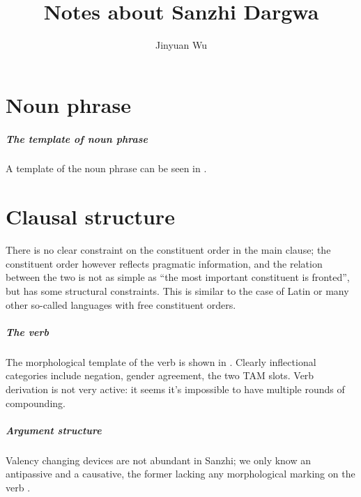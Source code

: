 \documentclass[a4paper, oneside, 12pt]{report}
\title{Notes about Sanzhi Dargwa}
\author{Jinyuan Wu}
\newcommand*{\citesec}[1]{\S~{#1}}
\newcommand*{\citetable}[1]{Table~{#1}}
\begin{document}
\maketitle

\chapter{Noun phrase}

\paragraph*{The template of noun phrase} A template of the noun phrase 
can be seen in \citet[\citesec{21.1.3}]{forker2020grammar}.


\chapter{Clausal structure}

There is no clear constraint 
on the constituent order in the main clause;
the constituent order however reflects pragmatic information,
and the relation between the two is not as simple as 
``the most important constituent is fronted'',
but has some structural constraints.
This is similar to the case of Latin or many other so-called 
languages with free constituent orders.

\paragraph*{The verb} The morphological template of the verb
is shown in \citet[\citetable{11.9}]{forker2020grammar}.
Clearly inflectional categories include 
negation, gender agreement, the two TAM slots.
Verb derivation is not very active:
it seems it's impossible to have multiple rounds of compounding.

\paragraph*{Argument structure} Valency changing devices are not abundant in Sanzhi;
we only know an antipassive and a causative,
the former lacking any morphological marking on the verb 
\citep[\citesec{19.2.1}]{forker2020grammar}.
\end{document}
